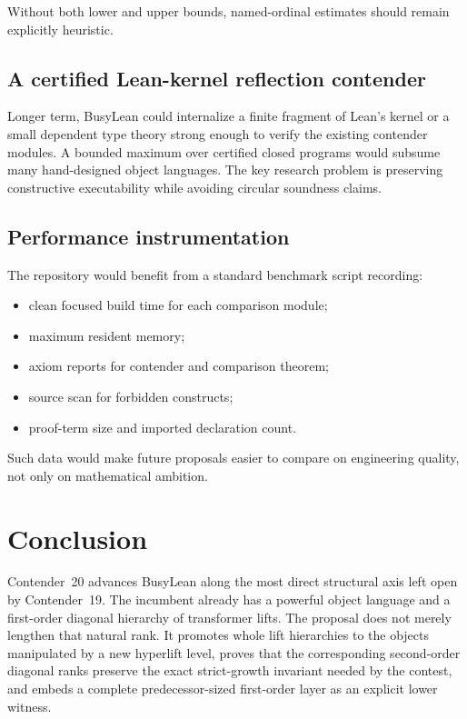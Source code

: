 \documentclass[11pt]{article}
\theoremstyle{definition}
\theoremstyle{remark}
\begin{document}
Without both lower and upper bounds, named-ordinal estimates should remain
explicitly heuristic.

\subsection{A certified Lean-kernel reflection contender}

Longer term, BusyLean could internalize a finite fragment of Lean's kernel or a
small dependent type theory strong enough to verify the existing contender
modules. A bounded maximum over certified closed programs would subsume many
hand-designed object languages. The key research problem is preserving
constructive executability while avoiding circular soundness claims.

\subsection{Performance instrumentation}

The repository would benefit from a standard benchmark script recording:

\begin{itemize}[leftmargin=*]
\item clean focused build time for each comparison module;
\item maximum resident memory;
\item axiom reports for contender and comparison theorem;
\item source scan for forbidden constructs;
\item proof-term size and imported declaration count.
\end{itemize}

Such data would make future proposals easier to compare on engineering quality,
not only on mathematical ambition.

\section{Conclusion}

Contender~20 advances BusyLean along the most direct structural axis left open
by Contender~19. The incumbent already has a powerful object language and a
first-order diagonal hierarchy of transformer lifts. The proposal does not
merely lengthen that natural rank. It promotes whole lift hierarchies to the
objects manipulated by a new hyperlift level, proves that the corresponding
second-order diagonal ranks preserve the exact strict-growth invariant needed
by the contest, and embeds a complete predecessor-sized first-order layer as an
explicit lower witness.
\end{document}
